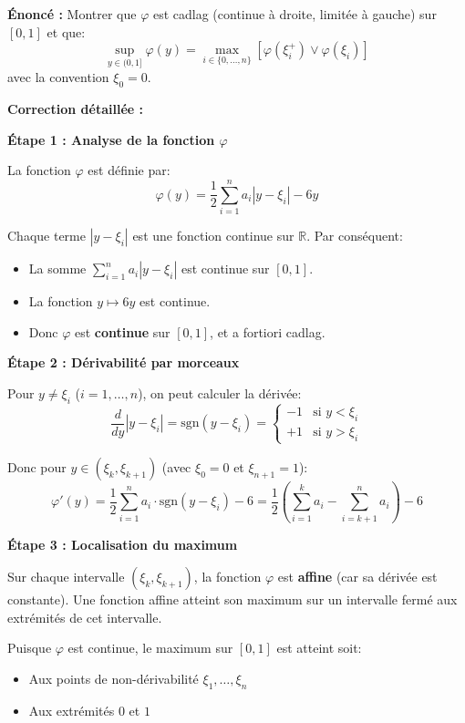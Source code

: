 \documentclass[12pt,a4paper]{article}
\theoremstyle{definition}
\newcommand{\R}{\mathbb{R}}
\begin{document}
\textbf{Énoncé :} Montrer que $\varphi$ est cadlag (continue à droite, limitée à gauche) sur $[0,1]$ et que:
\[
\sup_{y \in (0,1]} \varphi(y) = \max_{i \in \{0,\ldots,n\}} \left[ \varphi(\xi_i^+) \vee \varphi(\xi_i) \right]
\]
avec la convention $\xi_0 = 0$.

\textbf{Correction détaillée :}

\textbf{Étape 1 : Analyse de la fonction $\varphi$}

La fonction $\varphi$ est définie par:
\[
\varphi(y) = \frac{1}{2} \sum_{i=1}^{n} a_i |y - \xi_i| - 6y
\]

Chaque terme $|y - \xi_i|$ est une fonction continue sur $\R$. Par conséquent:
\begin{itemize}
    \item La somme $\sum_{i=1}^{n} a_i |y - \xi_i|$ est continue sur $[0,1]$.
    \item La fonction $y \mapsto 6y$ est continue.
    \item Donc $\varphi$ est \textbf{continue} sur $[0,1]$, et a fortiori cadlag.
\end{itemize}

\textbf{Étape 2 : Dérivabilité par morceaux}

Pour $y \neq \xi_i$ ($i = 1, \ldots, n$), on peut calculer la dérivée:
\[
\frac{d}{dy}|y - \xi_i| = \text{sgn}(y - \xi_i) = 
\begin{cases}
-1 & \text{si } y < \xi_i \\
+1 & \text{si } y > \xi_i
\end{cases}
\]

Donc pour $y \in (\xi_{k}, \xi_{k+1})$ (avec $\xi_0 = 0$ et $\xi_{n+1} = 1$):
\[
\varphi'(y) = \frac{1}{2} \sum_{i=1}^{n} a_i \cdot \text{sgn}(y - \xi_i) - 6 = \frac{1}{2} \left( \sum_{i=1}^{k} a_i - \sum_{i=k+1}^{n} a_i \right) - 6
\]

\textbf{Étape 3 : Localisation du maximum}

Sur chaque intervalle $(\xi_k, \xi_{k+1})$, la fonction $\varphi$ est \textbf{affine} (car sa dérivée est constante). Une fonction affine atteint son maximum sur un intervalle fermé aux extrémités de cet intervalle.

Puisque $\varphi$ est continue, le maximum sur $[0,1]$ est atteint soit:
\begin{itemize}
    \item Aux points de non-dérivabilité $\xi_1, \ldots, \xi_n$
    \item Aux extrémités $0$ et $1$
\end{itemize}
\end{document}
